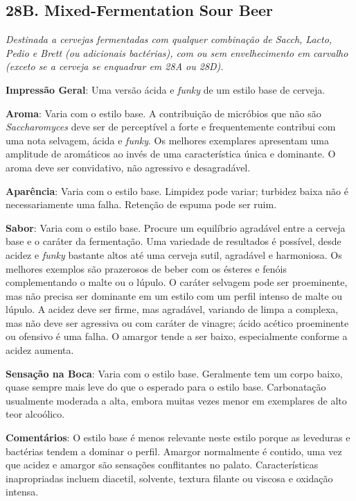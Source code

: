\subsection*{28B. Mixed-Fermentation Sour Beer}
\textit{Destinada a cervejas fermentadas com qualquer combinação de Sacch, Lacto, Pedio e Brett (ou adicionais bactérias), com ou sem envelhecimento em carvalho (exceto se a cerveja se enquadrar em 28A ou 28D).}

\textbf{Impressão Geral}: Uma versão ácida e \textit{funky} de um estilo base de cerveja.

\textbf{Aroma}: Varia com o estilo base. A contribuição de micróbios que não são \textit{Saccharomyces} deve ser de perceptível a forte e frequentemente contribui com uma nota selvagem, ácida e \textit{funky}. Os melhores exemplares apresentam uma amplitude de aromáticos ao invés de uma característica única e dominante. O aroma deve ser convidativo, não agressivo e desagradável.

\textbf{Aparência}: Varia com o estilo base. Limpidez pode variar; turbidez baixa não é necessariamente uma falha. Retenção de espuma pode ser ruim.

\textbf{Sabor}: Varia com o estilo base. Procure um equilíbrio agradável entre a cerveja base e o caráter da fermentação. Uma variedade de resultados é possível, desde acidez e \textit{funky} bastante altos até uma cerveja sutil, agradável e harmoniosa. Os melhores exemplos são prazerosos de beber com os ésteres e fenóis complementando o malte ou o lúpulo. O caráter selvagem pode ser proeminente, mas não precisa ser dominante em um estilo com um perfil intenso de malte ou lúpulo. A acidez deve ser firme, mas agradável, variando de limpa a complexa, mas não deve ser agressiva ou com caráter de vinagre; ácido acético proeminente ou ofensivo é uma falha. O amargor tende a ser baixo, especialmente conforme a acidez aumenta.

\textbf{Sensação na Boca}: Varia com o estilo base. Geralmente tem um corpo baixo, quase sempre mais leve do que o esperado para o estilo base. Carbonatação usualmente moderada a alta, embora muitas vezes menor em exemplares de alto teor alcoólico.

\textbf{Comentários}: O estilo base é menos relevante neste estilo porque as leveduras e bactérias tendem a dominar o perfil. Amargor normalmente é contido, uma vez que acidez e amargor são sensações conflitantes no palato. Características inapropriadas incluem diacetil, solvente, textura filante ou viscosa e oxidação intensa.

